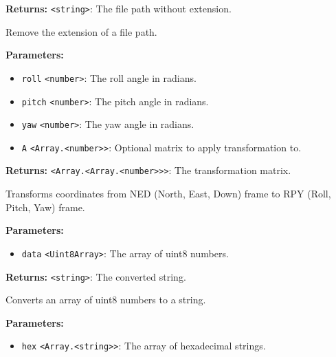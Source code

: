 \documentclass[12pt,a4paper]{article}
\begin{document}
\noindent \textbf{Returns:} \texttt{<string>}: The file path without extension.

\noindent Remove the extension of a file path.

\vspace{5mm}
\noindent {}


\noindent \textbf{Parameters:}
\begin{itemize}
  \item \texttt{roll} \texttt{<number>}: The roll angle in radians.
  \item \texttt{pitch} \texttt{<number>}: The pitch angle in radians.
  \item \texttt{yaw} \texttt{<number>}: The yaw angle in radians.
  \item \texttt{A} \texttt{<Array.<number>>}: Optional matrix to apply transformation to.
\end{itemize}

\noindent \textbf{Returns:} \texttt{<Array.<Array.<number>>>}: The transformation matrix.

\noindent Transforms coordinates from NED (North, East, Down) frame to RPY (Roll, Pitch, Yaw) frame.

\vspace{5mm}
\noindent {}


\noindent \textbf{Parameters:}
\begin{itemize}
  \item \texttt{data} \texttt{<Uint8Array>}: The array of uint8 numbers.
\end{itemize}

\noindent \textbf{Returns:} \texttt{<string>}: The converted string.

\noindent Converts an array of uint8 numbers to a string.

\vspace{5mm}
\noindent {}


\noindent \textbf{Parameters:}
\begin{itemize}
  \item \texttt{hex} \texttt{<Array.<string>>}: The array of hexadecimal strings.
\end{itemize}
\end{document}
